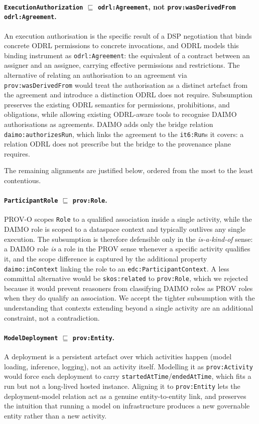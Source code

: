 \documentclass[11pt,a4paper]{article}
\newcommand{\code}[1]{\texttt{#1}}
\begin{document}
\paragraph{\code{ExecutionAuthorization} $\sqsubseteq$ \code{odrl:Agreement}, not \code{prov:wasDerivedFrom odrl:Agreement}.} An execution authorisation is the specific result of a DSP negotiation that binds concrete ODRL permissions to concrete invocations, and ODRL models this binding instrument as \code{odrl:Agreement}: the equivalent of a contract between an assigner and an assignee, carrying effective permissions and restrictions. The alternative of relating an authorisation to an agreement via \code{prov:wasDerivedFrom} would treat the authorisation as a distinct artefact from the agreement and introduce a distinction ODRL does not require. Subsumption preserves the existing ODRL semantics for permissions, prohibitions, and obligations, while allowing existing ODRL-aware tools to recognise DAIMO authorisations as agreements. DAIMO adds only the bridge relation \code{daimo:authorizesRun}, which links the agreement to the \code{it6:Run}s it covers: a relation ODRL does not prescribe but the bridge to the provenance plane requires.

The remaining alignments are justified below, ordered from the most to the least contentious.

\paragraph{\code{ParticipantRole} $\sqsubseteq$ \code{prov:Role}.} PROV-O scopes \code{Role} to a qualified association inside a single activity, while the DAIMO role is scoped to a dataspace context and typically outlives any single execution. The subsumption is therefore defensible only in the \emph{is-a-kind-of} sense: a DAIMO role \emph{is} a role in the PROV sense whenever a specific activity qualifies it, and the scope difference is captured by the additional property \code{daimo:inContext} linking the role to an \code{edc:ParticipantContext}. A less committal alternative would be \code{skos:related} to \code{prov:Role}, which we rejected because it would prevent reasoners from classifying DAIMO roles as PROV roles when they do qualify an association. We accept the tighter subsumption with the understanding that contexts extending beyond a single activity are an additional constraint, not a contradiction.

\paragraph{\code{ModelDeployment} $\sqsubseteq$ \code{prov:Entity}.} A deployment is a persistent artefact over which activities happen (model loading, inference, logging), not an activity itself. Modelling it as \code{prov:Activity} would force each deployment to carry \code{startedAtTime}/\code{endedAtTime}, which fits a run but not a long-lived hosted instance. Aligning it to \code{prov:Entity} lets the deployment-model relation act as a genuine entity-to-entity link, and preserves the intuition that running a model on infrastructure produces a new governable entity rather than a new activity.
\end{document}
